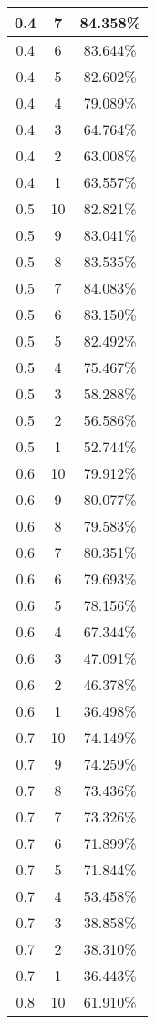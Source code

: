 \begin{center}
\begin{longtable}{|c|c|c|}
\hline
0.4 & 7 & 84.358\% \\
\hline
0.4 & 6 & 83.644\% \\
\hline
0.4 & 5 & 82.602\% \\
\hline
0.4 & 4 & 79.089\% \\
\hline
0.4 & 3 & 64.764\% \\
\hline
0.4 & 2 & 63.008\% \\
\hline
0.4 & 1 & 63.557\% \\
\hline
\hline
0.5 & 10 & 82.821\% \\
\hline
0.5 & 9 & 83.041\% \\
\hline
0.5 & 8 & 83.535\% \\
\hline
0.5 & 7 & 84.083\% \\
\hline
0.5 & 6 & 83.150\% \\
\hline
0.5 & 5 & 82.492\% \\
\hline
0.5 & 4 & 75.467\% \\
\hline
0.5 & 3 & 58.288\% \\
\hline
0.5 & 2 & 56.586\% \\
\hline
0.5 & 1 & 52.744\% \\
\hline
\hline
0.6 & 10 & 79.912\% \\
\hline
0.6 & 9 & 80.077\% \\
\hline
0.6 & 8 & 79.583\% \\
\hline
0.6 & 7 & 80.351\% \\
\hline
0.6 & 6 & 79.693\% \\
\hline
0.6 & 5 & 78.156\% \\
\hline
0.6 & 4 & 67.344\% \\
\hline
0.6 & 3 & 47.091\% \\
\hline
0.6 & 2 & 46.378\% \\
\hline
0.6 & 1 & 36.498\% \\
\hline
\hline
0.7 & 10 & 74.149\% \\
\hline
0.7 & 9 & 74.259\% \\
\hline
0.7 & 8 & 73.436\% \\
\hline
0.7 & 7 & 73.326\% \\
\hline
0.7 & 6 & 71.899\% \\
\hline
0.7 & 5 & 71.844\% \\
\hline
0.7 & 4 & 53.458\% \\
\hline
0.7 & 3 & 38.858\% \\
\hline
0.7 & 2 & 38.310\% \\
\hline
0.7 & 1 & 36.443\% \\
\hline
\hline
0.8 & 10 & 61.910\% \\

\end{longtable}
\end{center}
